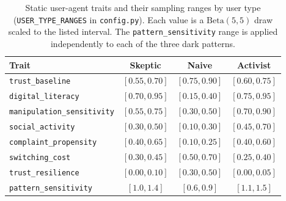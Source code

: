 \documentclass[11pt]{article}
\newcommand{\code}[1]{\texttt{#1}}
\begin{document}
\begin{table}[!ht]
\centering
\caption{Static user-agent traits and their sampling ranges by user type
(\code{USER\_TYPE\_RANGES} in \code{config.py}). Each value is a
$\mathrm{Beta}(5,5)$ draw scaled to the listed interval. The
\code{pattern\_sensitivity} range is applied independently to each of the three
dark patterns.}
\label{tab:traits}
\small
\begin{tabular}{lccc}
\toprule
Trait & Skeptic & Naive & Activist \\
\midrule
\code{trust\_baseline}            & $[0.55, 0.70]$ & $[0.75, 0.90]$ & $[0.60, 0.75]$ \\
\code{digital\_literacy}          & $[0.70, 0.95]$ & $[0.15, 0.40]$ & $[0.75, 0.95]$ \\
\code{manipulation\_sensitivity}  & $[0.55, 0.75]$ & $[0.30, 0.50]$ & $[0.70, 0.90]$ \\
\code{social\_activity}           & $[0.30, 0.50]$ & $[0.10, 0.30]$ & $[0.45, 0.70]$ \\
\code{complaint\_propensity}      & $[0.40, 0.65]$ & $[0.10, 0.25]$ & $[0.40, 0.60]$ \\
\code{switching\_cost}            & $[0.30, 0.45]$ & $[0.50, 0.70]$ & $[0.25, 0.40]$ \\
\code{trust\_resilience}          & $[0.00, 0.10]$ & $[0.30, 0.50]$ & $[0.00, 0.05]$ \\
\code{pattern\_sensitivity}       & $[1.0, 1.4]$   & $[0.6, 0.9]$   & $[1.1, 1.5]$   \\
\bottomrule
\end{tabular}
\end{table}
\end{document}
